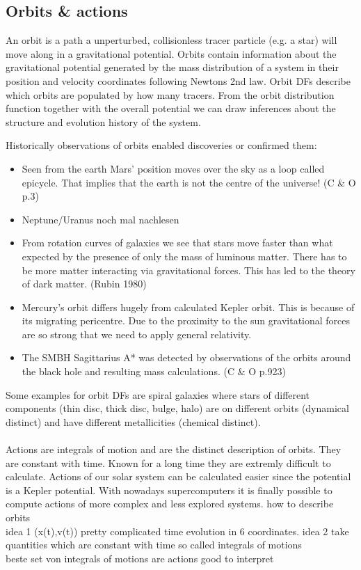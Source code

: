 \subsection{Orbits \& actions}
An orbit is a path a unperturbed, collisionless tracer particle (e.g. a star) will move along in a gravitational potential. Orbits contain information about the gravitational potential generated by the mass distribution of a system in their position and velocity coordinates following Newtons 2nd law. Orbit \ac{DFs} describe which orbits are populated by how many tracers. From the orbit distribution function together with the overall potential we can draw inferences about the structure and evolution history of the system. 
\par Historically observations of orbits enabled discoveries or confirmed them: 
\begin{itemize}
\item Seen from the earth Mars' position moves over the sky as a loop called epicycle. That implies that the earth is not the centre of the universe! (C \& O p.3)
\item Neptune/Uranus \color{red} noch mal nachlesen \color{black}
\item From rotation curves of galaxies we see that stars move faster than what expected by the presence of only the mass of luminous matter. There has to be more matter interacting via gravitational forces. This has led to the theory of dark matter. (Rubin 1980)
\item Mercury's orbit differs hugely from calculated Kepler orbit. This is because of its migrating pericentre. Due to the proximity to the sun gravitational forces are so strong that we need to apply general relativity.
\item The \ac{SMBH} Sagittarius A*  was detected by observations of the orbits around the black hole and resulting mass calculations. (C \& O p.923)
\end{itemize}
\par Some examples for orbit \ac{DFs} are spiral galaxies where stars of different components (thin disc, thick disc, bulge, halo) are on different orbits (dynamical distinct) and have different metallicities (chemical distinct).
\\\\
Actions are integrals of motion and are the distinct description of orbits. They are constant with time. Known for a long time they are extremly difficult to calculate. Actions of our solar system can be calculated easier since the potential is a Kepler potential. With nowadays supercomputers it is finally possible to compute actions of more complex and less explored systems.
\color{green} how to describe orbits \\ idea 1 (x(t),v(t)) pretty complicated time evolution in 6 coordinates. idea 2 take quantities which are constant with time so called integrals of motions \\ beste set von integrals of motions are actions good to interpret \color{black}
